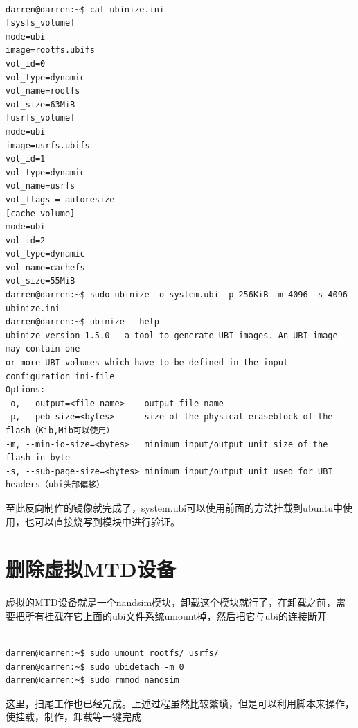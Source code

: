 \begin{mdframed}[backgroundcolor=lightgray,hidealllines=true]
\begin{verbatim}

darren@darren:~$ cat ubinize.ini
[sysfs_volume]
mode=ubi
image=rootfs.ubifs
vol_id=0
vol_type=dynamic
vol_name=rootfs
vol_size=63MiB
[usrfs_volume]
mode=ubi
image=usrfs.ubifs
vol_id=1
vol_type=dynamic
vol_name=usrfs
vol_flags = autoresize
[cache_volume]
mode=ubi
vol_id=2
vol_type=dynamic
vol_name=cachefs
vol_size=55MiB
darren@darren:~$ sudo ubinize -o system.ubi -p 256KiB -m 4096 -s 4096 ubinize.ini
darren@darren:~$ ubinize --help
ubinize version 1.5.0 - a tool to generate UBI images. An UBI image may contain one 
or more UBI volumes which have to be defined in the input configuration ini-file
Options:
-o, --output=<file name>    output file name
-p, --peb-size=<bytes>      size of the physical eraseblock of the flash（Kib,Mib可以使用）
-m, --min-io-size=<bytes>   minimum input/output unit size of the flash in byte
-s, --sub-page-size=<bytes> minimum input/output unit used for UBI headers（ubi头部偏移）

\end{verbatim}
\end{mdframed}
至此反向制作的镜像就完成了，system.ubi可以使用前面的方法挂载到ubuntu中使用，也可以直接烧写到模块中进行验证。
\section{删除虚拟MTD设备}
虚拟的MTD设备就是一个nandsim模块，卸载这个模块就行了，在卸载之前，需要把所有挂载在它上面的ubi文件系统umount掉，然后把它与ubi的连接断开
\begin{mdframed}[backgroundcolor=lightgray,hidealllines=true]
\begin{verbatim}

darren@darren:~$ sudo umount rootfs/ usrfs/
darren@darren:~$ sudo ubidetach -m 0
darren@darren:~$ sudo rmmod nandsim

\end{verbatim}
\end{mdframed}
这里，扫尾工作也已经完成。上述过程虽然比较繁琐，但是可以利用脚本来操作，使挂载，制作，卸载等一键完成
